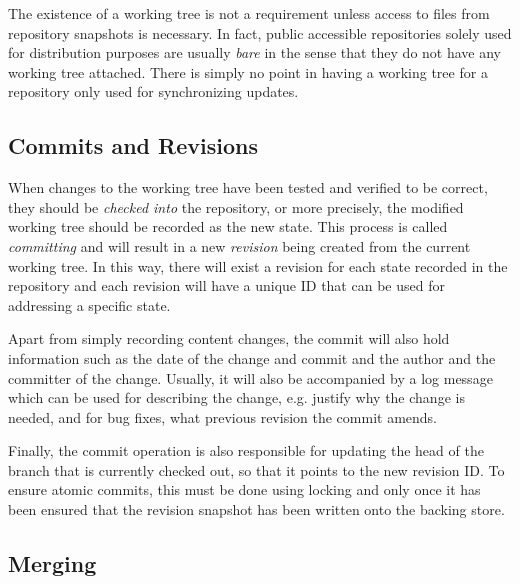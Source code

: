The existence of a working tree is not a requirement unless access to
files from repository snapshots is necessary. In fact, public
accessible repositories solely used for distribution purposes are
usually \emph{bare} in the sense that they do not have any working
tree attached. There is simply no point in having a working tree for a
repository only used for synchronizing updates.

\subsection{Commits and Revisions}


When changes to the working tree have been tested and verified to be
correct, they should be \emph{checked into} the repository, or more
precisely, the modified working tree should be recorded as the new state. This
process is called \emph{committing} and will result in a new
\emph{revision} being created from the current working tree. In this
way, there will exist a revision for each state recorded in the
repository and each revision will have a unique ID that can be used
for addressing a specific state.

Apart from simply recording content changes, the commit will also hold
information such as the date of the change and commit and the author and
the committer of the change. Usually, it will also be accompanied by a
log message which can be used for describing the change, e.g. justify
why the change is needed, and for bug fixes, what previous revision
the commit amends.

Finally, the commit operation is also responsible for updating the
head of the branch that is currently checked out, so that it points to
the new revision ID. To ensure atomic commits, this must be done using
locking and only once it has been ensured that the revision snapshot
has been written onto the backing store.

\subsection{Merging}
\label{sec:merging}

